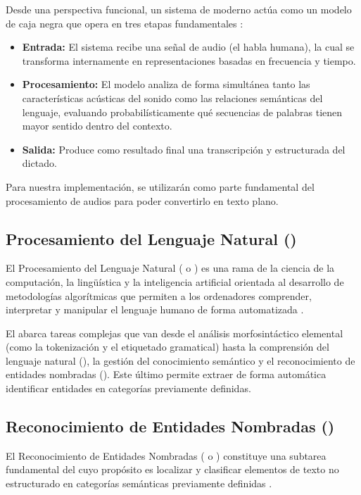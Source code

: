Desde una perspectiva funcional, un sistema de  moderno actúa como un modelo de caja negra que opera en tres etapas fundamentales :
\begin{itemize}
    \item \textbf{Entrada:} El sistema recibe una señal de audio (el habla humana), la cual se transforma internamente en representaciones basadas en frecuencia y tiempo.
    \item \textbf{Procesamiento:} El modelo analiza de forma simultánea tanto las características acústicas del sonido como las relaciones semánticas del lenguaje, evaluando probabilísticamente qué secuencias de palabras tienen mayor sentido dentro del contexto.
    \item \textbf{Salida:} Produce como resultado final una transcripción y estructurada del dictado.
\end{itemize}

Para nuestra implementación, se utilizarán como parte fundamental del procesamiento de audios para poder convertirlo
en texto plano.



\subsection{Procesamiento del Lenguaje Natural ()}
El Procesamiento del Lenguaje Natural ( o ) 
es una rama de la ciencia de la computación, la lingüística y la inteligencia artificial orientada 
al desarrollo de metodologías algorítmicas que permiten a los ordenadores comprender, 
interpretar y manipular el lenguaje humano de forma automatizada .

El  abarca tareas complejas que van desde el análisis morfosintáctico elemental 
(como la tokenización y el etiquetado gramatical) hasta la comprensión del lenguaje natural 
(), la gestión del conocimiento semántico y el reconocimiento de entidades nombradas (). 
Este último permite extraer de forma automática identificar entidades en categorías previamente definidas.

\subsection{Reconocimiento de Entidades Nombradas ()}\label{subsection:marco_teorico_ner}
El Reconocimiento de Entidades Nombradas ( o ) 
constituye una subtarea fundamental del  cuyo propósito es localizar y clasificar 
elementos de texto no estructurado en categorías semánticas previamente definidas .

